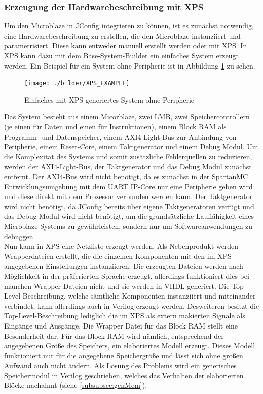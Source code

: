 \subsubsection{Erzeugung der Hardwarebeschreibung mit XPS}
Um den Microblaze in JConfig integrieren zu können, ist es zunächst notwendig, eine Hardwarebeschreibung zu erstellen, die den Microblaze instanziiert und parametrisiert.
Diese kann entweder manuell erstellt werden oder mit XPS. In XPS kann dazu mit dem Base-System-Builder ein einfaches System erzeugt werden. Ein Beispiel für ein System ohne Peripherie ist in Abbildung \ref{fig:XPS_EXAMPLE} zu sehen.
\begin{figure}[ht!]
\centering
\texttt{[image: ./bilder/XPS\_EXAMPLE]}
\caption{Einfaches mit XPS generiertes System ohne Peripherie}
\label{fig:XPS_EXAMPLE}
\end{figure}
Das System besteht aus einem Micorblaze, zwei LMB, zwei Speichercontrollern (je einen für Daten und einen für Instruktionen), einem Block RAM als Programm- und Datenspeicher, einem AXI4-Light-Bus zur Anbindung von Peripherie, einem Reset-Core, einem Taktgenerator und einem Debug Modul. Um die Komplexität des Systems und somit zusätzliche Fehlerquellen zu reduzieren, werden der AXI4-Light-Bus, der Taktgenerator und das Debug Modul zunächst entfernt. Der AXI4-Bus wird nicht benötigt, da es zunächst in der SpartanMC Entwicklungsumgebung mit dem UART IP-Core nur eine Peripherie geben wird und diese direkt mit dem Prozessor verbunden werden kann. Der Taktgenerator wird nicht benötigt, da JConfig bereits über eigene Taktgeneratoren verfügt und das Debug Modul wird nicht benötigt, um die grundsätzliche Lauffähigkeit eines Microblaze Systems zu gewährleisten, sondern nur um Softwareanwendungen zu debuggen.\\
Nun kann in XPS eine Netzliste erzeugt werden. Als Nebenprodukt werden Wrapperdateien erstellt, die die einzelnen Komponenten mit den im XPS angegebenen Einstellungen instanziieren. Die erzeugten Dateien werden nach Möglichkeit in der präferierten Sprache erzeugt, allerdings funktioniert dies bei manchen Wrapper Dateien nicht und sie werden in VHDL generiert. Die Top-Level-Beschreibung, welche sämtliche Komponenten instanziiert und miteinander verbindet, kann allerdings auch in Verilog erzeugt werden. Desweiteren besitzt die Top-Level-Beschreibung lediglich die im XPS als extern makierten Signale als Eingänge und Ausgänge. Die Wrapper Datei für das Block RAM stellt eine Besonderheit dar. Für das Block RAM wird nämlich, entsprechend der angegebenen Größe des Speichers, ein elaboriertes Modell erzeugt. Dieses Modell funktioniert nur für die angegebene Speichergröße und lässt sich ohne großen Aufwand auch nicht ändern. Als Lösung des Problems wird ein generisches Speichermodul in Verilog geschrieben, welches das Verhalten der elaborierten Blöcke nachahmt (siehe \ref{subsubsec:genMem}).\\
